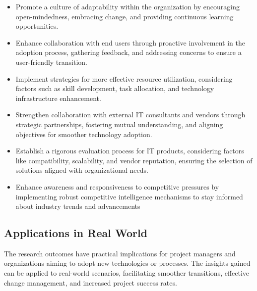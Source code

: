 \documentclass{article}
\begin{document}
\begin{itemize}
  \item Promote a culture of adaptability within the organization by encouraging open-mindedness, embracing change, and providing continuous learning opportunities.

  \item Enhance collaboration with end users through proactive involvement in the adoption process, gathering feedback, and addressing concerns to ensure a user-friendly transition.

  \item Implement strategies for more effective resource utilization, considering factors such as skill development, task allocation, and technology infrastructure enhancement.

  \item Strengthen collaboration with external IT consultants and vendors through strategic partnerships, fostering mutual understanding, and aligning objectives for smoother technology adoption.

  \item Establish a rigorous evaluation process for IT products, considering factors like compatibility, scalability, and vendor reputation, ensuring the selection of solutions aligned with organizational needs.

  \item Enhance awareness and responsiveness to competitive pressures by implementing robust competitive intelligence mechanisms to stay informed about industry trends and advancements

\end{itemize}

\subsection{Applications in Real World}
The research outcomes have practical implications for project managers and organizations aiming to adopt new technologies or processes. The insights gained can be applied to real-world scenarios, facilitating smoother transitions, effective change management, and increased project success rates.
\end{document}
